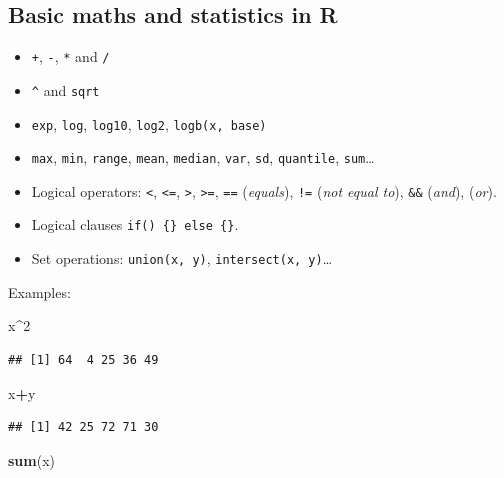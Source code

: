 \documentclass[
]{article}
\newenvironment{Shaded}{\begin{snugshade}}{\end{snugshade}}
\newcommand{\DecValTok}[1]{\textcolor[rgb]{0.00,0.00,0.81}{#1}}
\newcommand{\KeywordTok}[1]{\textcolor[rgb]{0.13,0.29,0.53}{\textbf{#1}}}
\newcommand{\NormalTok}[1]{#1}
\newcommand{\OperatorTok}[1]{\textcolor[rgb]{0.81,0.36,0.00}{\textbf{#1}}}
\providecommand{\tightlist}{%
  \setlength{\itemsep}{0pt}\setlength{\parskip}{0pt}}
\begin{document}
\hypertarget{basic-maths-and-statistics-in-r}{%
\subsection{Basic maths and statistics in
R}\label{basic-maths-and-statistics-in-r}}

\begin{itemize}
\tightlist
\item
  \texttt{+}, \texttt{-}, \texttt{*} and \texttt{/}
\item
  \texttt{\^{}} and \texttt{sqrt}
\item
  \texttt{exp}, \texttt{log}, \texttt{log10}, \texttt{log2},
  \texttt{logb(x,\ base)}
\item
  \texttt{max}, \texttt{min}, \texttt{range}, \texttt{mean},
  \texttt{median}, \texttt{var}, \texttt{sd}, \texttt{quantile},
  \texttt{sum}\ldots{}
\item
  Logical operators: \texttt{\textless{}}, \texttt{\textless{}=},
  \texttt{\textgreater{}}, \texttt{\textgreater{}=}, \texttt{==}
  (\emph{equals}), \texttt{!=} (\emph{not equal to}), \texttt{\&\&}
  (\emph{and}), \texttt{\textbar{}\textbar{}} (\emph{or}).
\item
  Logical clauses \texttt{if()\ \{\}\ else\ \{\}}.
\item
  Set operations: \texttt{union(x,\ y)},
  \texttt{intersect(x,\ y)}\ldots{}
\end{itemize}

Examples:

\begin{Shaded}
\begin{Highlighting}[]
\NormalTok{x}\OperatorTok{^}\DecValTok{2}
\end{Highlighting}
\end{Shaded}

\begin{verbatim}
## [1] 64  4 25 36 49
\end{verbatim}

\begin{Shaded}
\begin{Highlighting}[]
\NormalTok{x}\OperatorTok{+}\NormalTok{y}
\end{Highlighting}
\end{Shaded}

\begin{verbatim}
## [1] 42 25 72 71 30
\end{verbatim}

\begin{Shaded}
\begin{Highlighting}[]
\KeywordTok{sum}\NormalTok{(x)}
\end{Highlighting}
\end{Shaded}
\end{document}
